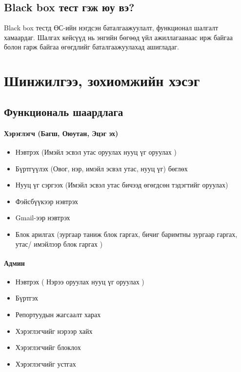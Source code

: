 \documentclass[
oneside, %
english, %
onehalfspacing, %
nolistspacing, %
headsepline, %
]{article} %
\begin{document}
		\subsection{Black box тест гэж юу вэ?}
		Black box тестд ӨС-ийн нэгдсэн баталгаажуулалт, функционал шалгалт хамаардаг. Шалгах кейсүүд нь энгийн бөгөөд үйл ажиллагаанаас ирж байгаа болон гарж байгаа өгөгдлийг баталгаажуулахад ашигладаг.
	\newpage
	\section{Шинжилгээ, зохиомжийн хэсэг}
	\subsection{Функциональ шаардлага}
	\paragraph {Хэрэглэгч (Багш, Оюутан, Эцэг эх)}
	\begin{itemize}
		
	\item Нэвтрэх (Имэйл эсвэл утас оруулах нууц үг оруулах )
	\item Бүртгүүлэх (Овог, нэр, имэйл эсвэл утас, нууц үг) бөглөх
	\item Нууц үг сэргээх (Имэйл эсвэл утас бичээд өгөгдсөн тэдэгтийг оруулах)
	\item Фэйсбүүкээр нэвтрэх 
	\item Gmail-ээр нэвтрэх
	\item Блок арилгах (зургаар таниж блок гаргах, бичиг баримтны зургаар гаргах, утас/ имэйлээр блок гаргах )
	
     \end{itemize}
     \paragraph {Админ}
     \begin{itemize}
 	
 	\item Нэвтрэх ( Нэрээ оруулах нууц үг оруулах )
 	\item Бүртгэх
 	\item Репортуудын жагсаалт харах
 	\item Хэрэглэгчийг нэрээр хайх
 	\item Хэрэглэгчийг блоклох
 	\item Хэрэглэгчийг устгах
 
 	
    \end{itemize}
\end{document}
